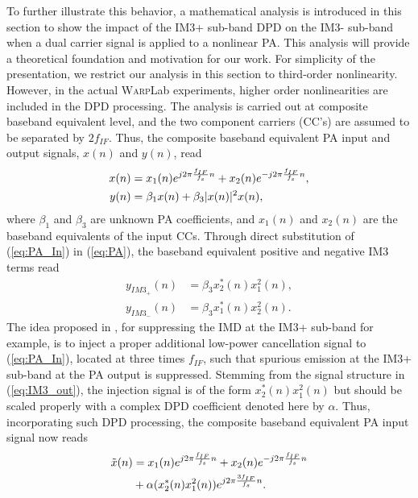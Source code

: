 To further illustrate this behavior, a mathematical analysis is introduced in this section to show the impact of the IM3+ sub-band DPD on the IM3- sub-band when a dual carrier signal is applied to a nonlinear PA. 
This analysis will provide a theoretical foundation and motivation for our work. 
For simplicity of the presentation, we restrict our analysis in this section to third-order nonlinearity. 
However, in the actual \textsc{Warp}Lab experiments, higher order nonlinearities are included in the DPD processing.
The analysis is carried out at composite baseband equivalent level, and the two component carriers (CC's) are assumed to be separated by $2 f_{IF}$. Thus, the composite baseband equivalent PA input and output signals, $x(n)$ and $y(n)$, read
\begin{align}
\small
x(n) &= x_1(n) e^{j 2\pi \frac{f_{IF}}{f_s} n} + x_2(n) e^{-j 2\pi \frac{f_{IF}}{f_s} n}, \label{eq:PA_In} \\
y(n) &= \beta_1 x(n) + \beta_3 |x(n)|^2 x(n), \label{eq:PA}
\end{align}
\normalsize 
where $\beta_1$ and $\beta_3$ are unknown PA coefficients, and $x_1(n)$ and $x_2(n)$ are the baseband equivalents of the input CCs. 
Through direct substitution of (\ref{eq:PA_In}) in (\ref{eq:PA}), the baseband equivalent positive and negative IM3 terms read
\begin{align}
y_{IM3_+}(n) &= \beta_3  x_2^*(n)x_1^2(n), \label{eq:IM3_out} \\
y_{IM3_-}(n) &= \beta_3  x_1^*(n)x_2^2(n). 
\label{eq:IM3_neg_out}
\end{align}
\normalsize
The idea proposed in \cite{ICASSP2014}, for suppressing the IMD at the IM3+ sub-band for example, is to inject a proper additional low-power cancellation signal to (\ref{eq:PA_In}), located at three times $f_{IF}$, such that spurious emission at the IM3+ sub-band at the PA output is suppressed. 
Stemming from the signal structure in (\ref{eq:IM3_out}), the injection signal is of the form $x_2^*(n)x_1^2(n)$ but should be scaled properly with a complex DPD coefficient denoted here by $\alpha$. 
Thus, incorporating such DPD processing, the composite baseband equivalent PA input signal now reads
\begin{align}
\small
\tilde{x}(n) &= x_1(n) e^{j 2\pi \frac{f_{IF}}{f_s} n} + x_2(n) e^{-j 2\pi \frac{f_{IF}}{f_s} n} \nonumber\\ 
&+ \alpha(x_2^*(n)x_1^2(n)) e^{j 2\pi \frac{3 f_{IF}}{f_s} n}. \label{eq:PA_In_DPD}
\end{align}
\normalsize

